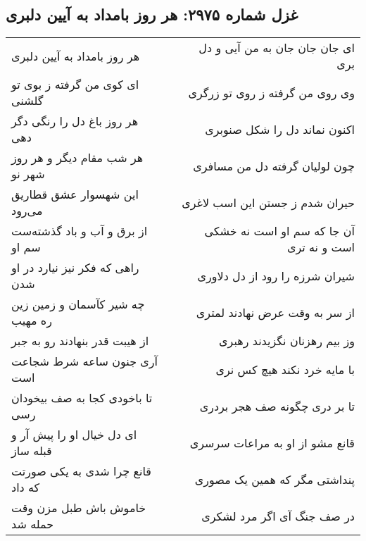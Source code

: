 \begin{center}
\section*{غزل شماره ۲۹۷۵: هر روز بامداد به آیین دلبری}
\label{sec:2975}
\begin{longtable}{l p{0.5cm} r}
هر روز بامداد به آیین دلبری
&&
ای جان جان جان به من آیی و دل بری
\\
ای کوی من گرفته ز بوی تو گلشنی
&&
وی روی من گرفته ز روی تو زرگری
\\
هر روز باغ دل را رنگی دگر دهی
&&
اکنون نماند دل را شکل صنوبری
\\
هر شب مقام دیگر و هر روز شهر نو
&&
چون لولیان گرفته دل من مسافری
\\
این شهسوار عشق قطاریق می‌رود
&&
حیران شدم ز جستن این اسب لاغری
\\
از برق و آب و باد گذشته‌ست سم او
&&
آن جا که سم او است نه خشکی است و نه تری
\\
راهی که فکر نیز نیارد در او شدن
&&
شیران شرزه را رود از دل دلاوری
\\
چه شیر کآسمان و زمین زین ره مهیب
&&
از سر به وقت عرض نهادند لمتری
\\
از هیبت قدر بنهادند رو به جبر
&&
وز بیم رهزنان نگزیدند رهبری
\\
آری جنون ساعه شرط شجاعت است
&&
با مایه خرد نکند هیچ کس نری
\\
تا باخودی کجا به صف بیخودان رسی
&&
تا بر دری چگونه صف هجر بردری
\\
ای دل خیال او را پیش آر و قبله ساز
&&
قانع مشو از او به مراعات سرسری
\\
قانع چرا شدی به یکی صورتت که داد
&&
پنداشتی مگر که همین یک مصوری
\\
خاموش باش طبل مزن وقت حمله شد
&&
در صف جنگ آی اگر مرد لشکری
\\
\end{longtable}
\end{center}

